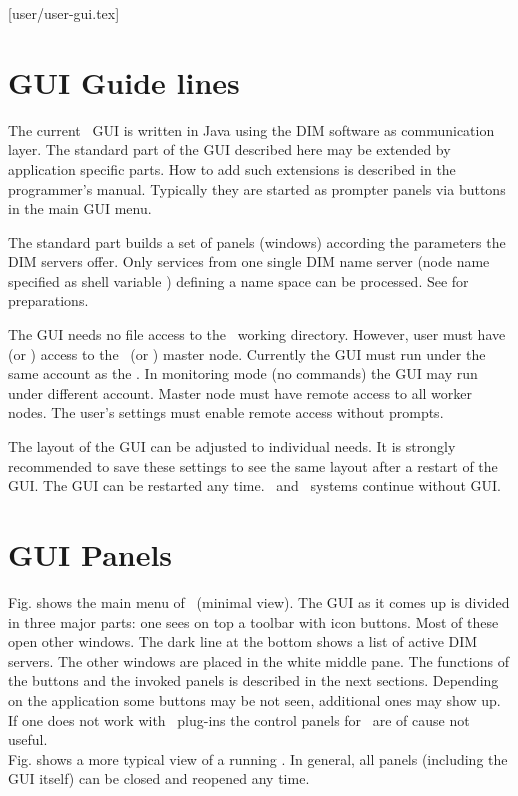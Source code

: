 [user/user-gui.tex]
\label{user-gui-chapter}
\section{GUI Guide lines}
The current \dabc\ GUI is written in Java using the DIM software as communication layer.
The standard part of the GUI described here may be extended by application specific parts.
How to add such extensions is described in the programmer's manual.
Typically they are started as prompter panels via buttons in the
main GUI menu.

The standard part builds a set of panels (windows) according the parameters
the DIM servers offer. Only services from one single DIM name server
(node name specified as shell variable )
defining a name space can be processed.
See  for preparations.

The GUI needs no file access to the \dabc\ working directory.
However, user must have  (or ) access to
the \dabc\ (or \mbs) master node.
Currently the GUI must run under the same account as the \dabc.
In monitoring mode (no commands) the GUI may run under different account.
Master node must have remote access to all worker nodes.
The user's  settings must enable remote access without
prompts.

The layout of the GUI can be adjusted to individual needs.
It is strongly recommended to save these settings to see the same layout
after a restart of the GUI. The GUI can be restarted any time.
\dabc\ and \mbs\ systems continue without GUI.

\section{GUI Panels}
Fig.  shows the main menu of \dabc\ (minimal view).
The GUI as it comes up is divided in three major parts: 
one sees on top a toolbar with icon buttons. Most of these open
other windows. The dark line at the bottom shows a list of active DIM servers.
The other windows are placed in the white middle pane. The functions of the buttons and the
invoked panels is described in the next sections.
Depending on the application some buttons may be not seen, additional ones may show up.
If one does not work with \mbs\ plug-ins the control panels for \mbs\
are of cause not useful.\\
Fig. \paref{fig:user-gui-full-screen} shows a more typical view of a running \dabc.
In general, all panels (including the GUI itself) can be closed and reopened any time.

